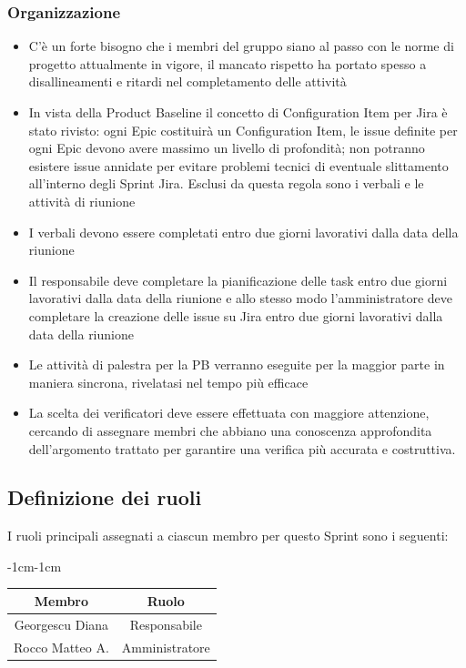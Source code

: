\documentclass[a4paper,12pt]{article}
\begin{document}
\subsubsection{Organizzazione}
\begin{itemize}
    \item C'è un forte bisogno che i membri del gruppo siano al passo con le norme di progetto attualmente in vigore, il mancato rispetto ha portato spesso a disallineamenti e ritardi nel completamento delle attività
    \item In vista della Product Baseline il concetto di Configuration Item per Jira è stato rivisto: ogni Epic costituirà un Configuration Item, le issue definite per ogni Epic devono avere massimo un livello di profondità; non potranno esistere issue annidate per evitare problemi tecnici di eventuale slittamento all'interno degli Sprint Jira. Esclusi da questa regola sono i verbali e le attività di riunione
    \item I verbali devono essere completati entro due giorni lavorativi dalla data della riunione
    \item Il responsabile deve completare la pianificazione delle task entro due giorni lavorativi dalla data della riunione e allo stesso modo l'amministratore deve completare la creazione delle issue su Jira entro due giorni lavorativi dalla data della riunione
    \item Le attività di palestra per la PB verranno eseguite per la maggior parte in maniera sincrona, rivelatasi nel tempo più efficace
    \item La scelta dei verificatori deve essere effettuata con maggiore attenzione, cercando di assegnare membri che abbiano una conoscenza approfondita dell'argomento trattato per garantire una verifica più accurata e costruttiva.
\end{itemize}


\subsection{Definizione dei ruoli}
I ruoli principali assegnati a ciascun membro per questo Sprint sono i seguenti:
\begin{table}[H]
    \begin{adjustwidth}{-1cm}{-1cm}
    \centering
\begin{tabular}{|c|c|}
    \hline
    \textbf{Membro} & \textbf{Ruolo} \\
    \hline
    Georgescu Diana & Responsabile \\
    \hline
    Rocco Matteo A. & Amministratore \\
    \hline
\end{tabular}
    \end{adjustwidth}
\end{table}
\end{document}
